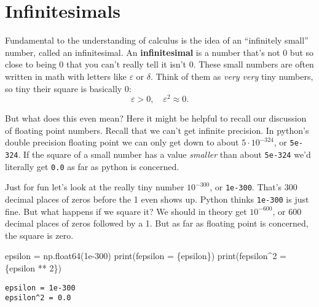 \documentclass[
  letterpaper,
  DIV=11,
  numbers=noendperiod]{scrreprt}
\newenvironment{Shaded}{\begin{snugshade}}{\end{snugshade}}
\newcommand{\BuiltInTok}[1]{\textcolor[rgb]{0.00,0.23,0.31}{#1}}
\newcommand{\DecValTok}[1]{\textcolor[rgb]{0.68,0.00,0.00}{#1}}
\newcommand{\FloatTok}[1]{\textcolor[rgb]{0.68,0.00,0.00}{#1}}
\newcommand{\NormalTok}[1]{\textcolor[rgb]{0.00,0.23,0.31}{#1}}
\newcommand{\OperatorTok}[1]{\textcolor[rgb]{0.37,0.37,0.37}{#1}}
\newcommand{\SpecialCharTok}[1]{\textcolor[rgb]{0.37,0.37,0.37}{#1}}
\newcommand{\SpecialStringTok}[1]{\textcolor[rgb]{0.13,0.47,0.30}{#1}}
\begin{document}
\hypertarget{infinitesimals}{%
\section{Infinitesimals}\label{infinitesimals}}

Fundamental to the understanding of calculus is the idea of an
``infinitely small'' number, called an infinitesimal. An
\textbf{infinitesimal} is a number that's not 0 but so close to being 0
that you can't really tell it isn't 0. These small numbers are often
written in math with letters like \(\varepsilon\) or \(\delta\). Think
of them as \emph{very very} tiny numbers, so tiny their square is
basically 0: \[\varepsilon > 0, \quad \varepsilon^2 \approx 0.\]

But what does this even mean? Here it might be helpful to recall our
discussion of floating point numbers. Recall that we can't get infinite
precision. In python's double precision floating point we can only get
down to about \(5 \cdot 10^{-324}\), or \texttt{5e-324}. If the square
of a small number has a value \emph{smaller} than about \texttt{5e-324}
we'd literally get \texttt{0.0} as far as python is concerned.

Just for fun let's look at the really tiny number \(10^{-300}\), or
\texttt{1e-300}. That's 300 decimal places of zeros before the 1 even
shows up. Python thinks \texttt{1e-300} is just fine. But what happens
if we square it? We should in theory get \(10^{-600}\), or 600 decimal
places of zeros followed by a 1. But as far as floating point is
concerned, the square is zero.

\begin{Shaded}
\begin{Highlighting}[]
\NormalTok{epsilon }\OperatorTok{=}\NormalTok{ np.float64(}\FloatTok{1e{-}300}\NormalTok{)}
\BuiltInTok{print}\NormalTok{(}\SpecialStringTok{f\textquotesingle{}epsilon = }\SpecialCharTok{\{}\NormalTok{epsilon}\SpecialCharTok{\}}\SpecialStringTok{\textquotesingle{}}\NormalTok{)}
\BuiltInTok{print}\NormalTok{(}\SpecialStringTok{f\textquotesingle{}epsilon\^{}2 = }\SpecialCharTok{\{}\NormalTok{epsilon }\OperatorTok{**} \DecValTok{2}\SpecialCharTok{\}}\SpecialStringTok{\textquotesingle{}}\NormalTok{)}
\end{Highlighting}
\end{Shaded}

\begin{verbatim}
epsilon = 1e-300
epsilon^2 = 0.0
\end{verbatim}
\end{document}
